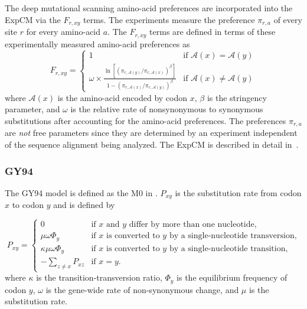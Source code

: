\documentclass[11pt]{article}
\begin{document}
The deep mutational scanning amino-acid preferences are incorporated into the ExpCM via the $F_{r,xy}$ terms.
The experiments measure the preference $\pi_{r,a}$ of every site $r$ for every amino-acid $a$.
The $F_{r,xy}$ terms are defined in terms of these experimentally measured amino-acid preferences as
\begin{equation}
\label{eq:Frxy}
F_{r,xy} = 
\begin{cases}
   1 & \mbox{if $\mathcal{A}\left(x\right) = \mathcal{A}\left(y\right)$} \\
   \omega \times \frac{\ln\left[\left(\pi_{r,\mathcal{A}\left(y\right)} / \pi_{r,\mathcal{A}\left(x\right)}\right)^{\beta}\right]}{1 - \left(\pi_{r,\mathcal{A}\left(x\right)} / \pi_{r,\mathcal{A}\left(y\right)}\right)^{\beta}} & \mbox{if $\mathcal{A}\left(x\right) \ne \mathcal{A}\left(y\right)$}
   \end{cases}
\end{equation}
where $\mathcal{A}\left(x\right)$ is the amino-acid encoded by codon $x$, $\beta$ is the stringency parameter, and $\omega$ is the relative rate of nonsynonymous to synonymous substitutions after accounting for the amino-acid preferences.
The preferences $\pi_{r,a}$ are \emph{not} free parameters since they are determined by an experiment independent of the sequence alignment being analyzed.
The ExpCM is described in detail in~\citet{hilton2017phydms}. 

\subsubsection*{GY94}

The GY94 model is defined as the M0 in \cite{yang2000codon}. 
$P_{xy}$ is the substitution rate from codon $x$ to codon $y$ and is defined by

\begin{equation}
\label{eq:GY94}
P_{xy} = 
\begin{cases}
  0 & \mbox{if $x$ and $y$ differ by more than one nucleotide,}\\
  \mu \omega \Phi_{y} & \mbox{if $x$ is converted to $y$ by a single-nucleotide transversion,} \\
  \kappa \mu \omega \Phi_{y} & \mbox{if $x$ is converted to $y$ by a single-nucleotide transition,} \\
  -\sum\limits_{z \ne x} P_{xz} & \mbox{if $x = y$.}
  \end{cases}
\end{equation}
where $\kappa$ is the transition-transversion ratio, $\Phi_y$ is the equilibrium frequency of
codon $y$, $\omega$ is the gene-wide rate of non-synonymous change, and $\mu$ is the substitution rate.
\end{document}
